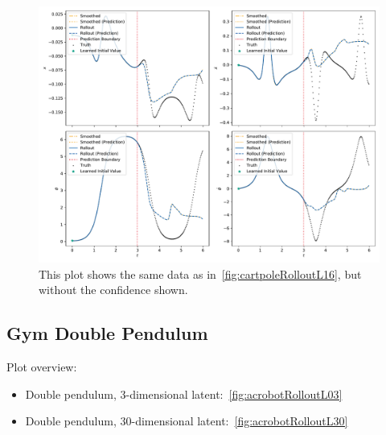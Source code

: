		\begin{figure}
			\centering
			\includegraphics[width=\linewidth]{figures/results/cartpole-gym/run-latent-dim-16/without-confidence/rollout-observations-N0.pdf}
			\caption[Rollout of the cartpole experiment for 14 latent dimensions without confidence]{This plot shows the same data as in~\autoref{fig:cartpoleRolloutL16}, but without the confidence shown.}
			\label{fig:cartpoleRolloutL16Appendix}
		\end{figure}

	\subsection{Gym Double Pendulum}
		Plot overview:
		\begin{itemize}
			\item Double pendulum, 3-dimensional latent:~\autoref{fig:acrobotRolloutL03}
			\item Double pendulum, 30-dimensional latent:~\autoref{fig:acrobotRolloutL30}
		\end{itemize}

